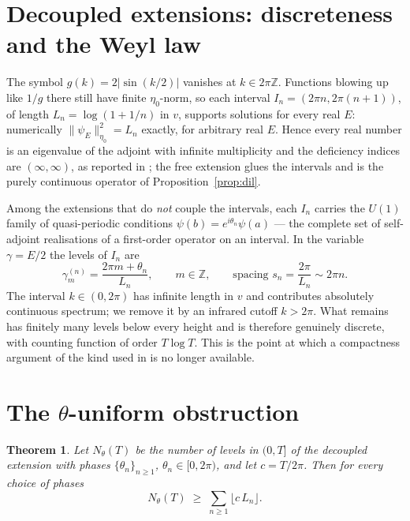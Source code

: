 \documentclass[11pt,a4paper]{article}
\newtheorem{theorem}{Theorem}
\theoremstyle{remark}
\newcommand{\Z}{\mathbb{Z}}
\begin{document}
\section{Decoupled extensions: discreteness and the Weyl law}\label{sec:decoupled}

The symbol $g(k)=2|\sin(k/2)|$ vanishes at $k\in2\pi\Z$. Functions blowing up like $1/g$ there
still have finite $\eta_0$-norm, so each interval $I_n=(2\pi n,2\pi(n+1))$, of length
$L_n=\log(1+1/n)$ in $v$, supports solutions for every real $E$: numerically
$\|\psi_E\|_{\eta_0}^2=L_n$ exactly, for arbitrary real $E$. Hence every real number is an
eigenvalue of the adjoint with infinite multiplicity and the deficiency indices are
$(\infty,\infty)$, as reported in \cite{Liu2026}; the free extension glues the intervals and is
the purely continuous operator of Proposition~\ref{prop:dil}.

Among the extensions that do \emph{not} couple the intervals, each $I_n$ carries the $U(1)$ family
of quasi-periodic conditions $\psi(b)=e^{i\theta_n}\psi(a)$ --- the complete set of self-adjoint
realisations of a first-order operator on an interval. In the variable $\gamma=E/2$ the levels of
$I_n$ are
\begin{equation}\label{eq:ladder}
\gamma^{(n)}_m=\frac{2\pi m+\theta_n}{L_n},\qquad m\in\Z,
\qquad\text{spacing } s_n=\frac{2\pi}{L_n}\sim 2\pi n .
\end{equation}
The interval $k\in(0,2\pi)$ has infinite length in $v$ and contributes absolutely continuous
spectrum; we remove it by an infrared cutoff $k>2\pi$. What remains has finitely many levels below
every height and is therefore genuinely discrete, with counting function of order $T\log T$. This
is the point at which a compactness argument of the kind used in \cite{EndresSteiner2010} is no
longer available.

\section{The \texorpdfstring{$\theta$}{theta}-uniform obstruction}\label{sec:rigid}

\begin{theorem}\label{thm:main}
Let $N_\theta(T)$ be the number of levels in $(0,T]$ of the decoupled extension with phases
$\{\theta_n\}_{n\ge1}$, $\theta_n\in[0,2\pi)$, and let $c=T/2\pi$. Then for every choice of phases
\begin{equation}\label{eq:bound}
N_\theta(T)\;\ge\;\sum_{n\ge1}\bigl\lfloor c\,L_n\bigr\rfloor .
\end{equation}
\end{theorem}
\end{document}
